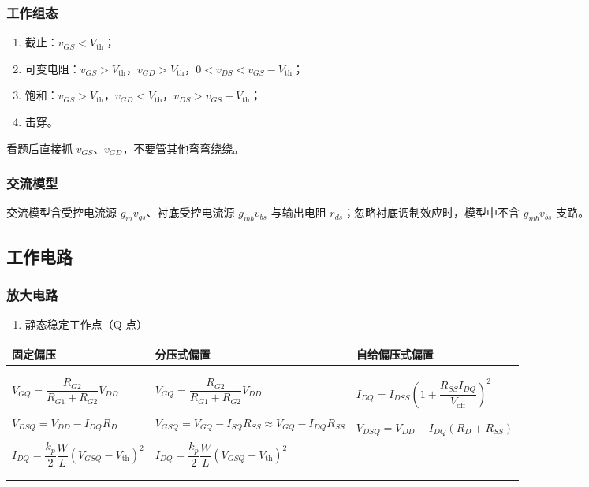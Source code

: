 \documentclass[UTF8,fontset=fandol,zihao=5]{ctexart}
\begin{document}
\subsubsection{工作组态}

\begin{enumerate}
  \item 截止：$v_{GS}<V_{\mathrm{th}}$；
  \item 可变电阻：$v_{GS}>V_{\mathrm{th}}$，$v_{GD}>V_{\mathrm{th}}$，$0<v_{DS}<v_{GS}-V_{\mathrm{th}}$；
  \item 饱和：$v_{GS}>V_{\mathrm{th}}$，$v_{GD}<V_{\mathrm{th}}$，$v_{DS}>v_{GS}-V_{\mathrm{th}}$；
  \item 击穿。
\end{enumerate}

\begin{methodbox}[【技巧】判断场效应管工作组态]
看题后直接抓 $v_{GS}$、$v_{GD}$，不要管其他弯弯绕绕。
\end{methodbox}

\subsubsection{交流模型}

交流模型含受控电流源 $g_m\dot v_{gs}$、衬底受控电流源 $g_{mb}\dot v_{bs}$ 与输出电阻 $r_{ds}$；忽略衬底调制效应时，模型中不含 $g_{mb}\dot v_{bs}$ 支路。

\subsection{工作电路}

\subsubsection{放大电路}

\begin{enumerate}
  \item 静态稳定工作点（Q 点）
\end{enumerate}

\begin{center}
\scriptsize
\renewcommand{\arraystretch}{1.55}
\begin{tabularx}{\textwidth}{XXX}
\toprule
固定偏压 & 分压式偏置 & 自给偏压式偏置 \\
\midrule
$V_{GQ}=\dfrac{R_{G2}}{R_{G1}+R_{G2}}V_{DD}$

$V_{DSQ}=V_{DD}-I_{DQ}R_D$

$I_{DQ}=\dfrac{k_p}{2}\dfrac WL(V_{GSQ}-V_{\mathrm{th}})^2$
&
$V_{GQ}=\dfrac{R_{G2}}{R_{G1}+R_{G2}}V_{DD}$

$V_{GSQ}=V_{GQ}-I_{SQ}R_{SS}\approx V_{GQ}-I_{DQ}R_{SS}$

$I_{DQ}=\dfrac{k_p}{2}\dfrac WL(V_{GSQ}-V_{\mathrm{th}})^2$
&
$I_{DQ}=I_{DSS}\left(1+\dfrac{R_{SS}I_{DQ}}{V_{\mathrm{off}}}\right)^2$

$V_{DSQ}=V_{DD}-I_{DQ}(R_D+R_{SS})$ \\
\bottomrule
\end{tabularx}
\end{center}
\end{document}
